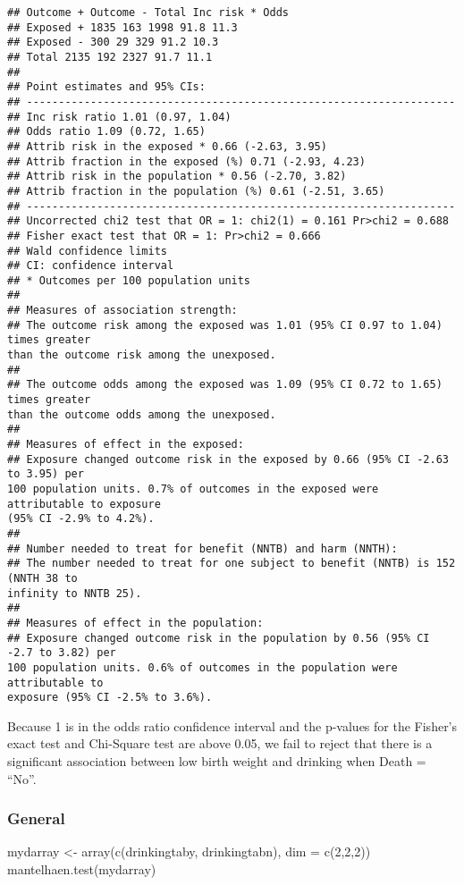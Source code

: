 \documentclass[
]{article}
\newenvironment{Shaded}{\begin{snugshade}}{\end{snugshade}}
\newcommand{\AttributeTok}[1]{\textcolor[rgb]{0.77,0.63,0.00}{#1}}
\newcommand{\DecValTok}[1]{\textcolor[rgb]{0.00,0.00,0.81}{#1}}
\newcommand{\FunctionTok}[1]{\textcolor[rgb]{0.00,0.00,0.00}{#1}}
\newcommand{\NormalTok}[1]{#1}
\newcommand{\OtherTok}[1]{\textcolor[rgb]{0.56,0.35,0.01}{#1}}
\begin{document}
\begin{verbatim}
## Outcome + Outcome - Total Inc risk * Odds
## Exposed + 1835 163 1998 91.8 11.3
## Exposed - 300 29 329 91.2 10.3
## Total 2135 192 2327 91.7 11.1
##
## Point estimates and 95% CIs:
## -------------------------------------------------------------------
## Inc risk ratio 1.01 (0.97, 1.04)
## Odds ratio 1.09 (0.72, 1.65)
## Attrib risk in the exposed * 0.66 (-2.63, 3.95)
## Attrib fraction in the exposed (%) 0.71 (-2.93, 4.23)
## Attrib risk in the population * 0.56 (-2.70, 3.82)
## Attrib fraction in the population (%) 0.61 (-2.51, 3.65)
## -------------------------------------------------------------------
## Uncorrected chi2 test that OR = 1: chi2(1) = 0.161 Pr>chi2 = 0.688
## Fisher exact test that OR = 1: Pr>chi2 = 0.666
## Wald confidence limits
## CI: confidence interval
## * Outcomes per 100 population units
##
## Measures of association strength:
## The outcome risk among the exposed was 1.01 (95% CI 0.97 to 1.04) times greater
than the outcome risk among the unexposed.
##
## The outcome odds among the exposed was 1.09 (95% CI 0.72 to 1.65) times greater
than the outcome odds among the unexposed.
##
## Measures of effect in the exposed:
## Exposure changed outcome risk in the exposed by 0.66 (95% CI -2.63 to 3.95) per
100 population units. 0.7% of outcomes in the exposed were attributable to exposure
(95% CI -2.9% to 4.2%).
##
## Number needed to treat for benefit (NNTB) and harm (NNTH):
## The number needed to treat for one subject to benefit (NNTB) is 152 (NNTH 38 to
infinity to NNTB 25).
##
## Measures of effect in the population:
## Exposure changed outcome risk in the population by 0.56 (95% CI -2.7 to 3.82) per
100 population units. 0.6% of outcomes in the population were attributable to
exposure (95% CI -2.5% to 3.6%).
\end{verbatim}

Because 1 is in the odds ratio confidence interval and the p-values for
the Fisher's exact test and Chi-Square test are above 0.05, we fail to
reject that there is a significant association between low birth weight
and drinking when Death = ``No''.

\hypertarget{general-1}{%
\subsubsection{General}\label{general-1}}

\begin{Shaded}
\begin{Highlighting}[]
\NormalTok{mydarray }\OtherTok{\textless{}{-}} \FunctionTok{array}\NormalTok{(}\FunctionTok{c}\NormalTok{(drinkingtaby, drinkingtabn), }\AttributeTok{dim =} \FunctionTok{c}\NormalTok{(}\DecValTok{2}\NormalTok{,}\DecValTok{2}\NormalTok{,}\DecValTok{2}\NormalTok{))}
\FunctionTok{mantelhaen.test}\NormalTok{(mydarray)}
\end{Highlighting}
\end{Shaded}
\end{document}
